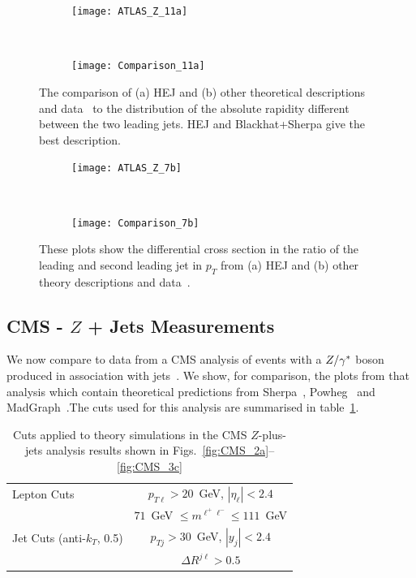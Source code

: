 	\begin{figure}[h]
	  \centering
	  \begin{subfigure}[b]{0.48\textwidth}
	    \texttt{[image: ATLAS\_Z\_11a]}
	    \caption{}
	    \label{fig:HEJ_ATLAS_11a}
	  \end{subfigure}
	  ~
	  \begin{subfigure}[b]{0.48\textwidth}
	    \texttt{[image: Comparison\_11a]}
	    \caption{}
	    \label{fig:MC_ATLAS_11a}
	  \end{subfigure}
	  \caption{The comparison of (a) HEJ and (b) other theoretical descriptions and
	    data~\cite{Aad:2013ysa} to
	    the distribution of the absolute rapidity different between the two leading
	    jets.  HEJ and Blackhat+Sherpa give the best description.}
	  \label{fig:ATLAS_11a}

	  \begin{subfigure}[b]{0.48\textwidth}
	    \texttt{[image: ATLAS\_Z\_7b]}
	    \caption{}
	    \label{fig:HEJ_ATLAS_7b}
	  \end{subfigure}
	  ~
	  \begin{subfigure}[b]{0.48\textwidth}
	    \texttt{[image: Comparison\_7b]}
	    \caption{}
	    \label{fig:MC_ATLAS_7b}
	  \end{subfigure}
	  \caption{These plots show the differential cross section in the ratio of the leading
	     and second leading jet in $p_T$ from (a) HEJ and (b) other
	    theory descriptions and data~\cite{Aad:2013ysa}.}
	  \label{fig:ATLAS_7b}
	\end{figure}

	\subsection{CMS - $Z$ + Jets Measurements}
	\label{sub:CMS}

	We now compare to data from a CMS analysis of events with a $Z/\gamma^*$ boson produced
	in association with jets~\cite{Khachatryan:2014zya}.  We show, for comparison,
	the plots from that analysis which contain theoretical predictions from
	Sherpa~\cite{Gleisberg:2008ta,Hoeche:2012yf}, Powheg~\cite{Alioli:2010qp} and
	MadGraph~\cite{Alwall:2014hca}.The cuts used for this analysis are summarised in
	table~\ref{tab:cmscuts}.

	\begin{table}[hbt]
	  \centering
	  \begin{tabular}{|l|c|}
	    \hline
	    Lepton Cuts & $p_{T\ell}>20$~GeV, \; $|\eta_\ell|<2.4$ \\
	    &\; $71$~GeV $\leq m^{\ell^+\ell^-} \leq
	      111$~GeV \\ \hline
	    Jet Cuts (anti-$k_T$, 0.5) & $p_{Tj}>30$~GeV, \; $|y_j|<2.4$ \\
	    & $\Delta R^{j\ell} >0.5$ \\
	\hline
	  \end{tabular}
	  \caption{Cuts applied to theory simulations in the CMS
	    $Z$-plus-jets analysis results shown in
	    Figs.~\ref{fig:CMS_2a}--\ref{fig:CMS_3c}}
	  \label{tab:cmscuts}
	\end{table}

